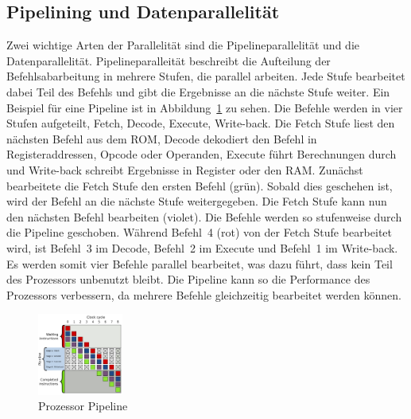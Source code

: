 \documentclass[conference]{IEEEtran}
\begin{document}




\subsection{Pipelining und Datenparallelität}
Zwei wichtige Arten der Parallelität sind die Pipelineparallelität und die Datenparallelität. Pipelineparalleität beschreibt die Aufteilung der Befehlsabarbeitung
in mehrere Stufen, die parallel arbeiten. Jede Stufe bearbeitet dabei Teil des Befehls und gibt die Ergebnisse an die nächste Stufe weiter.
Ein Beispiel für eine Pipeline ist in Abbildung~\ref{fig:pipeline} zu sehen. Die Befehle werden in vier Stufen aufgeteilt, Fetch, Decode, Execute, Write-back.
Die Fetch Stufe liest den nächsten Befehl aus dem ROM, Decode dekodiert den Befehl in Registeraddressen, Opcode oder Operanden, Execute führt Berechnungen durch und
Write-back schreibt Ergebnisse in Register oder den RAM\@.
Zunächst bearbeitete die Fetch Stufe den ersten Befehl (grün). Sobald dies geschehen ist, wird der Befehl an die nächste Stufe weitergegeben. Die Fetch Stufe kann nun den nächsten Befehl
bearbeiten (violet). Die Befehle werden so stufenweise durch die Pipeline geschoben. Während Befehl~4 (rot) von der Fetch Stufe bearbeitet wird,
ist Befehl~3 im Decode, Befehl~2 im Execute und Befehl~1 im Write-back. Es werden somit vier Befehle parallel bearbeitet, was dazu führt, dass kein Teil des Prozessors
unbenutzt bleibt. Die Pipeline kann so die Performance des Prozessors verbessern, da mehrere Befehle gleichzeitig bearbeitet werden können.

\begin{figure}[htbp]
    \centering
    \includegraphics[width=0.25\textwidth]{imgs/pipeline.png}
    \caption{Prozessor Pipeline~\cite{wikipedia_pipeline}}\label{fig:pipeline}
\end{figure}
\end{document}
